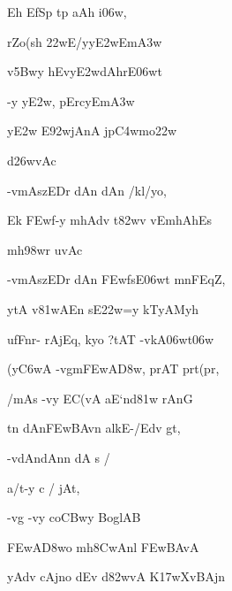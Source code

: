 \dnnemslokad 
{\dn {}\2 Eh EfSp\2 tp aAh i\306w, \vegdn\dontdisplaylinenum}


\ujvers\dnnemsloka 
{\dn rZo(sh\2 \322wE/yy\3E2wEm\3A3w\2}
\dontdisplaylinenum

\dnnemslokab 
{\dn v\4\35Bwy\2 hEvy\0\3E2wdAhrE\306wt \dandadn\dontdisplaylinenum}

\dnnemslokac 
{\dn {}-y y\3E2w, pErcy\0Em\3A3w\2}
\dontdisplaylinenum

\dnnemslokad 
{\dn y\3E2w\2 E\392wjAnA\2 jp\3C4wmo\322w \vegdn\dontdisplaylinenum}


\dnvers

{\dn d\?\326wvAc{\dandabdn}\dontdisplaylinenum }

{\dn -vmA\2szEDr\2 dAn\2 dAn\2 /kl/yo,{\dandadn} \dontdisplaylinenum}

{\dn Ek\2 \3FEwf-y\2 mhAd\?v t\382wv\2 vEmhAh\0Es \vegdn\dontdisplaylinenum}

{\dn mh\?\398wr uvAc{\dandabdn}\dontdisplaylinenum }

{\dn -vmA\2szEDr\2 dAn\2 \3FEwf\2sE\306wt mnFEqZ,{\dandadn} \dontdisplaylinenum}

{\dn {}ytA\2 v\0\381wAEn s\2E\322w=y kTyAMyh \vegdn\dontdisplaylinenum}

{\dn ufFnr- rAjEq\0, kyo {\rs ?\re}tAT\?{\qvb} -vkA\306wt\306w {\dandabdn} \dontdisplaylinenum}

{\dn (y\3C6wA -vg\0m\3FEwA\3D8w, prAT\?{\qvb} prt(pr, \vegdn\dontdisplaylinenum}

{\dn {}/mA\2s\2 -vy\2 EC(vA aE`nd\381w\2 rAnG\?{\dandabdn} \dontdisplaylinenum}

{\dn t\?n dAn\3FEwBAv\?n alk\0E-/Edv\2 gt, \vegdn\dontdisplaylinenum}

\nemsloka

\ujvers\dnnemsloka 
{\dn -vdAndAn\?n dA s /}
\dontdisplaylinenum

\dnnemslokab 
{\dn a/t-y c / jAt, \dandadn\dontdisplaylinenum}

\dnnemslokac 
{\dn -vg\?{\qvb} -vy\2 co\3CBwy BoglAB\2}
\dontdisplaylinenum

\dnnemslokad 
{\dn \3FEwA\3D8wo mh\38CwAnl \3FEwBAvA \vegdn\dontdisplaylinenum}


\dnvers

{\dn yAdv cAj\0no d\?Ev d\382wvA K\317wXvBAjn \vegdn\dontdisplaylinenum}

